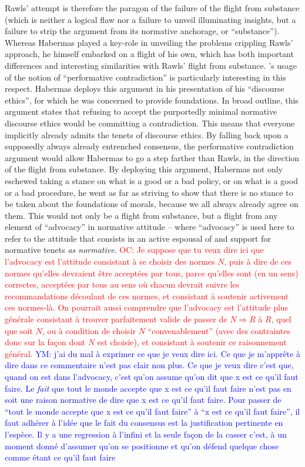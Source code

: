 \documentclass[preprint, french, english, 11pt]{elsarticle}%
\newcommand{\commentYM}[1]{\textcolor{blue}{YM: #1}}
\newcommand{\commentOC}[1]{\textcolor{red}{OC: #1}}
\begin{document}
Rawls' attempt is therefore the paragon of the failure of the flight from substance (which is neither a logical flaw nor a failure to unveil illuminating insights, but a failure to strip the argument from its normative anchorage, or ``substance''). Whereas Habermas played a key-role in unveiling the problems crippling Rawls' approach, he himself embarked on a flight of his own, which has both important differences and interesting similarities with Rawls' flight from substance. \cite{habermas_moralbewustsein_1983}'s usage of the notion of ``performative contradiction'' is particularly interesting in this respect. Habermas deploys this argument in his presentation of his ``discourse ethics'', for which he was concerned to provide foundations. In broad outline, this argument states that refusing to accept the purportedly minimal normative discourse ethics would be committing a contradiction. This means that everyone implicitly already admits the tenets of discourse ethics. By falling back upon a supposedly always already entrenched consensus, the performative contradiction argument would allow Habermas to go a step farther than Rawls, in the direction of the flight from substance. By deploying this argument, Habermas not only eschewed taking a stance on what is a good or a bad policy, or on what is a good or a bad procedure, he went as far as striving to show that there is no stance to be taken about the foundations of morals, because we all always already agree on them. This would not only be a flight from substance, but a flight from any element of ``advocacy'' in normative attitude -- where ``advocacy'' is used here to refer to the attitude that consists in an active espousal of and support for normative tenets \emph{as normative}. 
\commentOC{Je suppose que tu veux dire ici que l’advocacy est l’attitude consistant à se choisir des normes $N$, puis à dire de ces normes qu’elles devraient être acceptées par tous, parce qu’elles sont (en un sens) correctes, acceptées par tous au sens où chacun devrait suivre les recommandations découlant de ces normes, et consistant à soutenir activement ces normes-là. On pourrait aussi comprendre que l’advocacy est l’attitude plus générale consistant à trouver parfaitement valide de passer de $N ⇒ R$ à $R$, quel que soit $N$, ou à condition de choisir $N$ “convenablement” (avec des contraintes donc sur la façon dont $N$ est choisie), et consistant à soutenir ce raisonnement général.}
\commentYM{j'ai du mal à exprimer ce que je veux dire ici. Ce que je m'apprête à dire dans ce commentaire n'est pas clair non plus. Ce que je veux dire c'est que, quand on est dans l'advocacy, c'est qu'on assume qu'on dit que x est ce qu'il faut faire. Le \emph{fait} que tout le monde accepte que x est ce qu'il faut faire n'est pas en soit une raison normative de dire que x est ce qu'il faut faire. Pour passer de ``tout le monde accepte que x est ce qu'il faut faire'' à ``x est ce qu'il faut faire'', il faut adhérer à l'idée que le fait du consensus est la justification pertinente en l'espèce. Il y a une regression à l'infini et la seule façon de la casser c'est, à un moment donné d'assumer qu'on se positionne et qu'on défend quelque chose comme étant ce qu'il faut faire}
\end{document}
